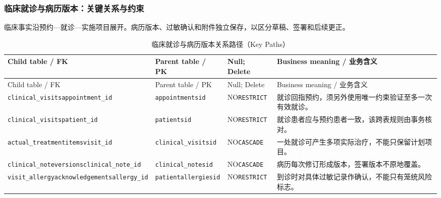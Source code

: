 \subsubsection{临床就诊与病历版本：关键关系与约束}
临床事实沿预约—就诊—实施项目展开。病历版本、过敏确认和附件独立保存，以区分草稿、签署和后续更正。

\begingroup\footnotesize\setlength{\tabcolsep}{3pt}
\begin{longtable}{@{}L{43mm}L{32mm}L{24mm}L{49mm}@{}}
\caption{临床就诊与病历版本关系路径（Key Paths）}\label{tab:domain-key-06}\\\toprule
Child table / FK & Parent table / PK & Null; Delete & Business meaning / 业务含义\\\midrule\endfirsthead
\toprule Child table / FK & Parent table / PK & Null; Delete & Business meaning / 业务含义\\\midrule\endhead
\texttt{clinical\_visits}\newline\texttt{appointment\_id} & \texttt{appointments}\newline\texttt{id} & NO\newline\texttt{RESTRICT} & 就诊回指预约，须另外使用唯一约束验证至多一次有效就诊。\\
\texttt{clinical\_visits}\newline\texttt{patient\_id} & \texttt{patients}\newline\texttt{id} & NO\newline\texttt{RESTRICT} & 就诊患者应与预约患者一致，该跨表规则由事务核对。\\
\texttt{actual\_treatment}\newline\texttt{items}\newline\texttt{visit\_id} & \texttt{clinical\_visits}\newline\texttt{id} & NO\newline\texttt{CASCADE} & 一处就诊可产生多项实际治疗，不能只保留计划项目。\\
\texttt{clinical\_note}\newline\texttt{versions}\newline\texttt{clinical\_note\_id} & \texttt{clinical\_notes}\newline\texttt{id} & NO\newline\texttt{CASCADE} & 病历每次修订形成版本，签署版本不原地覆盖。\\
\texttt{visit\_allergy}\newline\texttt{acknowledgements}\newline\texttt{allergy\_id} & \texttt{patient}\newline\texttt{allergies}\newline\texttt{id} & NO\newline\texttt{RESTRICT} & 到诊时对具体过敏记录作确认，不能只有笼统风险标志。\\
\bottomrule\end{longtable}\endgroup


